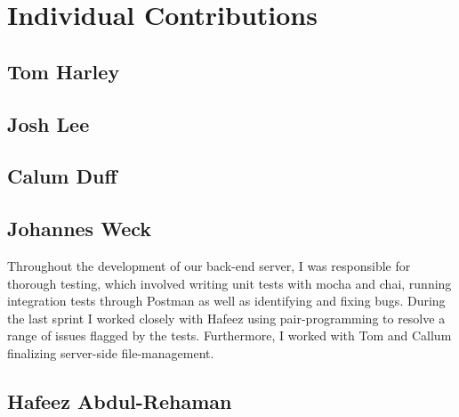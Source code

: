 \section{Individual Contributions}
\subsection{Tom Harley}
\subsection{Josh Lee}
\subsection{Calum Duff}
\subsection{Johannes Weck}
Throughout the development of our back-end server, I was responsible for thorough testing, which involved writing unit tests with mocha and chai, running integration tests through Postman as well as identifying and fixing bugs. During the last sprint I worked closely with Hafeez using pair-programming to resolve a range of issues flagged by the tests. Furthermore, I worked with Tom and Callum finalizing server-side file-management.
\subsection{Hafeez Abdul-Rehaman}
